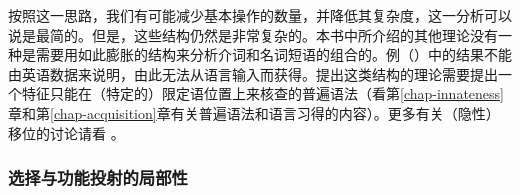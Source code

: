 按照这一思路，我们有可能减少基本操作的数量，并降低其复杂度，这一分析可以说是最简的。但是，这些结构仍然是非常复杂的。本书中所介绍的其他理论没有一种是需要用如此膨胀的结构来分析介词和名词短语的组合的。例（）中的结果不能由英语数据来说明，由此无法从语言输入而获得。提出这类结构的理论需要提出一个特征只能在（特定的）限定语位置上来核查的普遍语法（看第\ref{chap-innateness}章和第\ref{chap-acquisition}章有关普遍语法和语言习得的内容）。更多有关（隐性）移位的讨论请看 。

\subsubsection{选择与功能投射的局部性}

